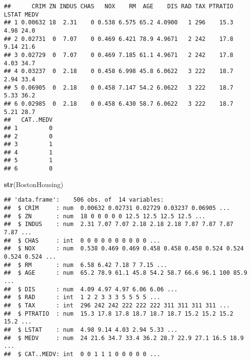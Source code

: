 \documentclass[
]{article}
\newenvironment{Shaded}{\begin{snugshade}}{\end{snugshade}}
\newcommand{\AttributeTok}[1]{\textcolor[rgb]{0.13,0.29,0.53}{#1}}
\newcommand{\FunctionTok}[1]{\textcolor[rgb]{0.13,0.29,0.53}{\textbf{#1}}}
\newcommand{\NormalTok}[1]{#1}
\newcommand{\OtherTok}[1]{\textcolor[rgb]{0.56,0.35,0.01}{#1}}
\newcommand{\SpecialCharTok}[1]{\textcolor[rgb]{0.81,0.36,0.00}{\textbf{#1}}}
\newcommand{\StringTok}[1]{\textcolor[rgb]{0.31,0.60,0.02}{#1}}
\begin{document}
\begin{verbatim}
##      CRIM ZN INDUS CHAS   NOX    RM  AGE    DIS RAD TAX PTRATIO LSTAT MEDV
## 1 0.00632 18  2.31    0 0.538 6.575 65.2 4.0900   1 296    15.3  4.98 24.0
## 2 0.02731  0  7.07    0 0.469 6.421 78.9 4.9671   2 242    17.8  9.14 21.6
## 3 0.02729  0  7.07    0 0.469 7.185 61.1 4.9671   2 242    17.8  4.03 34.7
## 4 0.03237  0  2.18    0 0.458 6.998 45.8 6.0622   3 222    18.7  2.94 33.4
## 5 0.06905  0  2.18    0 0.458 7.147 54.2 6.0622   3 222    18.7  5.33 36.2
## 6 0.02985  0  2.18    0 0.458 6.430 58.7 6.0622   3 222    18.7  5.21 28.7
##   CAT..MEDV
## 1         0
## 2         0
## 3         1
## 4         1
## 5         1
## 6         0
\end{verbatim}

\begin{Shaded}
\begin{Highlighting}[]
\FunctionTok{str}\NormalTok{(BostonHousing)}
\end{Highlighting}
\end{Shaded}

\begin{verbatim}
## 'data.frame':    506 obs. of  14 variables:
##  $ CRIM     : num  0.00632 0.02731 0.02729 0.03237 0.06905 ...
##  $ ZN       : num  18 0 0 0 0 0 12.5 12.5 12.5 12.5 ...
##  $ INDUS    : num  2.31 7.07 7.07 2.18 2.18 2.18 7.87 7.87 7.87 7.87 ...
##  $ CHAS     : int  0 0 0 0 0 0 0 0 0 0 ...
##  $ NOX      : num  0.538 0.469 0.469 0.458 0.458 0.458 0.524 0.524 0.524 0.524 ...
##  $ RM       : num  6.58 6.42 7.18 7 7.15 ...
##  $ AGE      : num  65.2 78.9 61.1 45.8 54.2 58.7 66.6 96.1 100 85.9 ...
##  $ DIS      : num  4.09 4.97 4.97 6.06 6.06 ...
##  $ RAD      : int  1 2 2 3 3 3 5 5 5 5 ...
##  $ TAX      : int  296 242 242 222 222 222 311 311 311 311 ...
##  $ PTRATIO  : num  15.3 17.8 17.8 18.7 18.7 18.7 15.2 15.2 15.2 15.2 ...
##  $ LSTAT    : num  4.98 9.14 4.03 2.94 5.33 ...
##  $ MEDV     : num  24 21.6 34.7 33.4 36.2 28.7 22.9 27.1 16.5 18.9 ...
##  $ CAT..MEDV: int  0 0 1 1 1 0 0 0 0 0 ...
\end{verbatim}

\begin{Shaded}
\end{Shaded}
\end{document}
